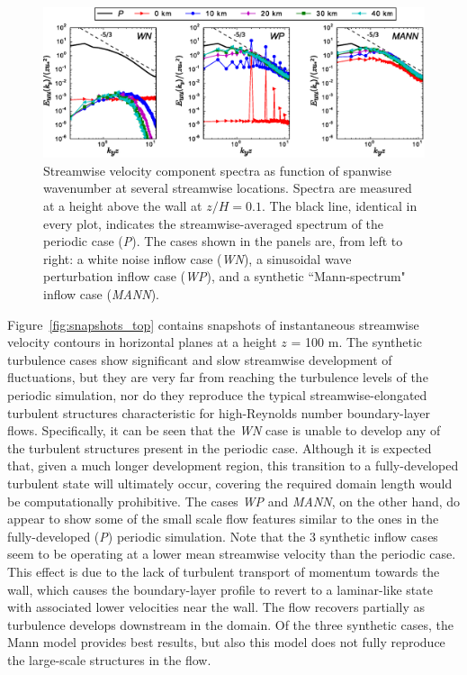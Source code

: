 	
	\begin{figure}[ht!]
		\centering
		\includegraphics[width=\textwidth]{chapters/turbulent_inflow/blm/figure2.eps}
		\caption[Streamwise velocity component spectra as function of spanwise wavenumber at several streamwise locations.]{Streamwise velocity component spectra as function of spanwise wavenumber at several streamwise locations. Spectra are measured at a height above the wall at $z/H = 0.1$. The black line, identical in every plot, indicates the streamwise-averaged spectrum of the periodic case (\emph{P}). The cases shown in the panels are, from left to right: a white noise inflow case (\emph{WN}), a sinusoidal wave perturbation inflow case (\emph{WP}), and a synthetic ``Mann-spectrum" inflow case (\emph{MANN}).}
		\label{fig:spectra}
	\end{figure}
	
	
	Figure~\ref{fig:snapshots_top} contains snapshots of instantaneous streamwise velocity contours in horizontal planes at a height $z$ = 100 m.
	The synthetic turbulence cases show significant and slow streamwise development of fluctuations, but they are very far from reaching the turbulence levels of the periodic simulation, nor do they reproduce the typical streamwise-elongated turbulent structures characteristic for high-Reynolds number boundary-layer flows.
	Specifically, it can be seen that the \emph{WN} case is unable to develop any of the turbulent structures present in the periodic case.  Although it is expected that, given a much longer development region, this transition to a fully-developed turbulent state will ultimately occur, covering the required domain length would be computationally prohibitive. The cases \emph{WP} and \emph{MANN}, on the other hand, do appear to show some of the small scale flow features similar to the ones in the fully-developed (\emph{P}) periodic simulation.  Note that the 3 synthetic inflow cases seem to be operating at a lower mean streamwise velocity than the periodic case. This effect is due to the lack of turbulent transport of momentum towards the wall, which causes the boundary-layer profile to revert to a laminar-like state with associated lower velocities near the wall. The flow recovers partially as turbulence develops downstream in the domain.  Of the three synthetic cases, the Mann model provides best results, but also this model does not fully reproduce the large-scale structures in the flow.
	
